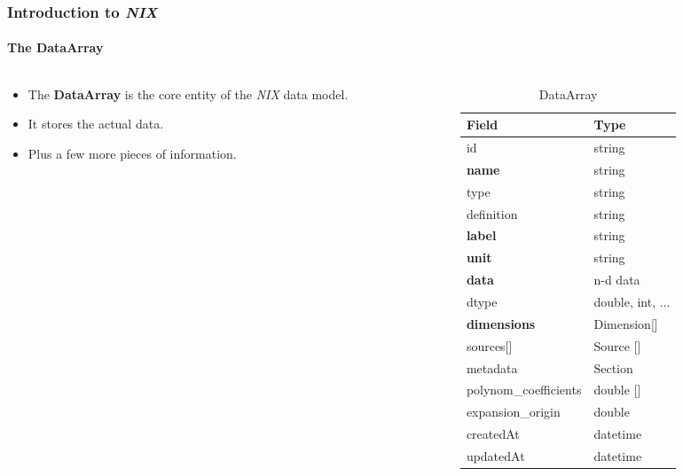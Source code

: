 \documentclass[pdftex, xcolor=table]{beamer}
\newcommand{\nix}{\textit{NIX}}
\newcommand{\dataarray}{\textbf{DataArray}}
\begin{document}
\begin{frame}
  \frametitle{Introduction to \nix{}}
  \framesubtitle{The \dataarray{}}
  \begin{columns}
    \begin{column}{5cm}
      \begin{itemize}
      \item The \dataarray{} is the core entity of the \nix{} data model.
      \item It stores the actual data.
      \item Plus a few more pieces of information.
      \end{itemize}
    \end{column}
    \begin{column}{6cm}
      \begin{table}[]
        \scriptsize
        \centering
        \captionsetup{labelformat=empty}
        \caption{DataArray}
        \begin{tabular}{|l|l|}
          \hline
          \rowcolor[HTML]{EFEFEF} 
          Field                   & Type             \\ \hline
          id                      & string           \\ \hline
          \textbf{name}           & string           \\ \hline
          type                    & string           \\ \hline
          definition              & string           \\ \hline
          \textbf{label}          & string           \\ \hline
          \textbf{unit}           & string           \\ \hline
          \textbf{data}           & n-d data         \\ \hline
          dtype                   & double, int, ... \\ \hline
          \textbf{dimensions}     & Dimension[]      \\ \hline
          sources[]               & Source []        \\ \hline
          metadata                & Section          \\ \hline
          polynom\_coefficients   & double []        \\ \hline
          expansion\_origin       & double           \\ \hline\hline
          createdAt               & datetime         \\ \hline
          updatedAt               & datetime         \\ \hline
        \end{tabular}
      \end{table}
      \normalsize
    \end{column}
  \end{columns}
\end{frame}
\end{document}
